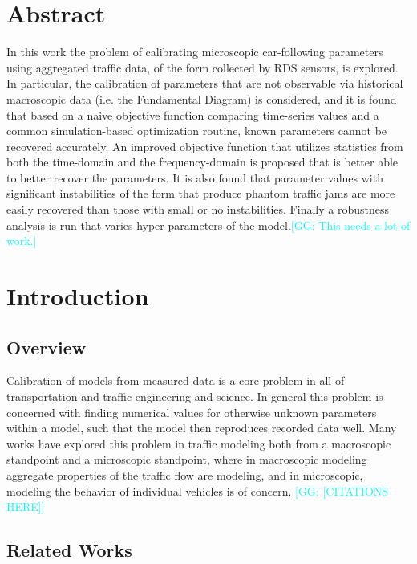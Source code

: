 \documentclass[english,titlepage,oneside,12pt]{article}
\newcommand{\kibitz}[2]{\ifnum\Comments=1\textcolor{#1}{#2}\fi}
\newcommand{\George}[1]{\kibitz{cyan}      {[GG: #1]}}
\begin{document}
\thispagestyle{empty}
\section{Abstract}\label{sec:Abstract}

In this work the problem of calibrating microscopic car-following parameters using aggregated traffic data, of the form collected by RDS sensors, is explored. In particular, the calibration of parameters that are not observable via historical macroscopic data (i.e. the Fundamental Diagram) is considered, and it is found that based on a naive objective function comparing time-series values and a common simulation-based optimization routine, known parameters cannot be recovered accurately. An improved objective function that utilizes statistics from both the time-domain and the frequency-domain is proposed that is better able to better recover the parameters. It is also found that parameter values with significant instabilities of the form that produce phantom traffic jams are more easily recovered than those with small or no instabilities. Finally a robustness analysis is run that varies hyper-parameters of the model.\George{This needs a lot of work.}

\section{Introduction}\label{sec:Introduction}


\subsection{Overview}\label{sec:Overview}

Calibration of models from measured data is a core problem in all of transportation and traffic engineering and science. In general this problem is concerned with finding numerical values for otherwise unknown parameters within a model, such that the model then reproduces recorded data well. Many works have explored this problem in traffic modeling both from a macroscopic standpoint and a microscopic standpoint, where in macroscopic modeling aggregate properties of the traffic flow are modeling, and in microscopic, modeling the behavior of individual vehicles is of concern. \George{[CITATIONS HERE]}

\subsection{Related Works}\label{sec:Related_Works}
\end{document}
